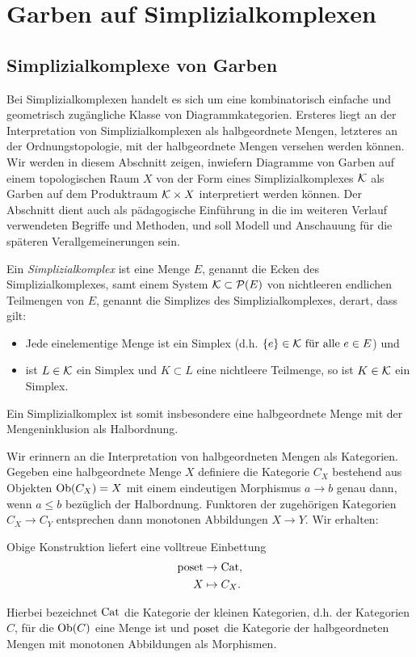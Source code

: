 
\chapter{Garben auf Simplizialkomplexen}
\label{ch:simp-comp}

\section{Simplizialkomplexe von Garben}
\label{sec:simp-comp-sheaf}

Bei Simplizialkomplexen handelt es sich um eine kombinatorisch
einfache und geometrisch zugängliche Klasse von
Diagrammkategorien. Ersteres liegt an der Interpretation von
Simplizialkomplexen als halbgeordnete Mengen, letzteres an der
Ordnungstopologie, mit der halbgeordnete Mengen versehen werden
können. Wir werden in diesem Abschnitt zeigen, inwiefern Diagramme von
Garben auf einem topologischen Raum $X$ von der Form eines
Simplizialkomplexes $\mathcal{K}$ als Garben auf dem Produktraum $\mathcal{K} \times X$
interpretiert werden können. Der Abschnitt dient auch als pädagogische
Einführung in die im weiteren Verlauf verwendeten Begriffe und
Methoden, und soll Modell und Anschauung für die späteren
Verallgemeinerungen sein.
\begin{defn}
  Ein \emph{Simplizialkomplex} ist eine Menge $E$, genannt die Ecken
  des Simplizialkomplexes, samt einem System $ \mathcal{K} \subset
  \mathcal{P}(E) $ von nichtleeren endlichen Teilmengen von $E$,
  genannt die Simplizes des Simplizialkomplexes, derart, dass gilt:
  \begin{itemize}
  \item Jede einelementige Menge ist ein Simplex (d.h. $\{e\} \in
    \mathcal{K} \text{ für alle } e \in E$) und
  \item ist $L \in \mathcal{K}$ ein Simplex und $K \subset L$ eine
    nichtleere Teilmenge, so ist $K \in \mathcal{K}$ ein Simplex.
  \end{itemize}
\end{defn}
Ein Simplizialkomplex ist somit insbesondere eine halbgeordnete Menge
mit der Mengeninklusion als Halbordnung.

Wir erinnern an die Interpretation von halbgeordneten Mengen als
Kategorien. Gegeben eine halbgeordnete Menge $X$ definiere die
Kategorie $C_X$ bestehend aus Objekten $\operatorname{Ob}(C_X) = X$ mit einem
eindeutigen Morphismus $a \to b$ genau dann, wenn $a \leq b$ bezüglich
der Halbordnung. Funktoren der zugehörigen Kategorien $C_X \to C_Y$
entsprechen dann monotonen Abbildungen $X \to Y$. Wir erhalten:
\begin{lemma} \label{poset-cat}
  Obige Konstruktion liefert eine volltreue Einbettung
  \begin{align*}
    \operatorname{poset} &\to \operatorname{Cat}, \\
    X &\mapsto C_X.    
  \end{align*}
\end{lemma}
Hierbei bezeichnet $\operatorname{Cat}$ die Kategorie der kleinen Kategorien,
d.h. der Kategorien $C$, für die $\operatorname{Ob}(C)$ eine Menge ist und $\operatorname{poset}$
die Kategorie der halbgeordneten Mengen mit monotonen Abbildungen als
Morphismen.

